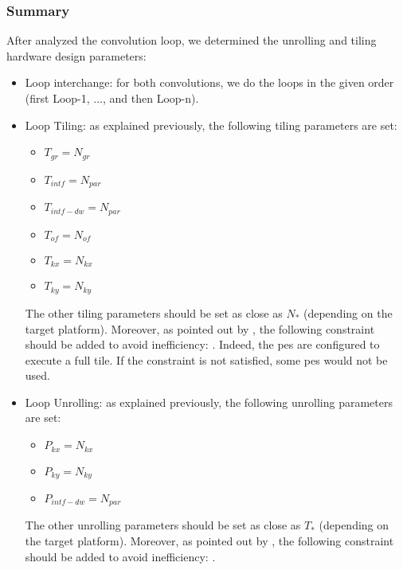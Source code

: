 \subsubsection{Summary}
%
After analyzed the convolution loop, we determined the unrolling and tiling hardware design parameters:
\begin{itemize}
    \item Loop interchange: for both convolutions, we do the loops in the given order (first Loop-1, ..., and then Loop-n).
    \item Loop Tiling: as explained previously, the following tiling parameters are set:
    \begin{itemize}
        \item $T_{gr} = N_{gr}$
        \item $T_{intf} = N_{par}$
        \item $T_{intf-dw} = N_{par}$
        \item $T_{of} = N_{of}$
        \item $T_{kx} = N_{kx}$
        \item $T_{ky} = N_{ky}$
    \end{itemize}
    The other tiling parameters should be set as close as $N_{*}$ (depending on the target platform). Moreover, as pointed out by \textcite{ma_optimizing_2018}, the following constraint should be added to avoid inefficiency: . Indeed, the \acrshort{pe}s are configured to execute a full tile. If the constraint is not satisfied, some \acrshort{pe}s would not be used.
    \item Loop Unrolling: as explained previously, the following unrolling parameters are set:
    \begin{itemize}
        \item $P_{kx} = N_{kx}$
        \item $P_{ky} = N_{ky}$
        \item $P_{intf-dw} = N_{par}$
    \end{itemize}
    The other unrolling parameters should be set as close as $T_{*}$ (depending on the target platform). Moreover, as pointed out by \textcite{ma_optimizing_2018}, the following constraint should be added to avoid inefficiency: .
\end{itemize}
